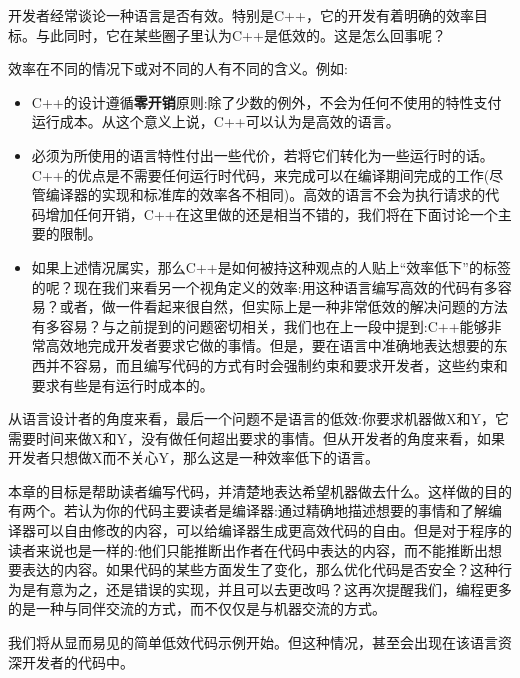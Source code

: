 开发者经常谈论一种语言是否有效。特别是C++，它的开发有着明确的效率目标。与此同时，它在某些圈子里认为C++是低效的。这是怎么回事呢？

效率在不同的情况下或对不同的人有不同的含义。例如:

\begin{itemize}
\item
C++的设计遵循\textbf{零开销}原则:除了少数的例外，不会为任何不使用的特性支付运行成本。从这个意义上说，C++可以认为是高效的语言。

\item
必须为所使用的语言特性付出一些代价，若将它们转化为一些运行时的话。C++的优点是不需要任何运行时代码，来完成可以在编译期间完成的工作(尽管编译器的实现和标准库的效率各不相同)。高效的语言不会为执行请求的代码增加任何开销，C++在这里做的还是相当不错的，我们将在下面讨论一个主要的限制。

\item
如果上述情况属实，那么C++是如何被持这种观点的人贴上“效率低下”的标签的呢？现在我们来看另一个视角定义的效率:用这种语言编写高效的代码有多容易？或者，做一件看起来很自然，但实际上是一种非常低效的解决问题的方法有多容易？与之前提到的问题密切相关，我们也在上一段中提到:C++能够非常高效地完成开发者要求它做的事情。但是，要在语言中准确地表达想要的东西并不容易，而且编写代码的方式有时会强制约束和要求开发者，这些约束和要求有些是有运行时成本的。
	
\end{itemize}

从语言设计者的角度来看，最后一个问题不是语言的低效:你要求机器做X和Y，它需要时间来做X和Y，没有做任何超出要求的事情。但从开发者的角度来看，如果开发者只想做X而不关心Y，那么这是一种效率低下的语言。 

本章的目标是帮助读者编写代码，并清楚地表达希望机器做去什么。这样做的目的有两个。若认为你的代码主要读者是编译器:通过精确地描述想要的事情和了解编译器可以自由修改的内容，可以给编译器生成更高效代码的自由。但是对于程序的读者来说也是一样的:他们只能推断出作者在代码中表达的内容，而不能推断出想要表达的内容。如果代码的某些方面发生了变化，那么优化代码是否安全？这种行为是有意为之，还是错误的实现，并且可以去更改吗？这再次提醒我们，编程更多的是一种与同伴交流的方式，而不仅仅是与机器交流的方式。

我们将从显而易见的简单低效代码示例开始。但这种情况，甚至会出现在该语言资深开发者的代码中。














